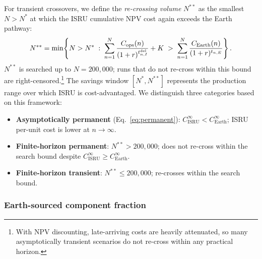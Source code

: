 \documentclass[5p,twocolumn]{elsarticle}
\begin{document}
For transient crossovers, we define the \emph{re-crossing volume} $N^{**}$ as the smallest $N > N^*$ at which the ISRU cumulative NPV cost again exceeds the Earth pathway:
\begin{equation}\footnotesize
  N^{**} = \min\!\left\{N > N^* \;:\; \sum_{n=1}^{N} \frac{C_{\mathrm{ops}}(n)}{(1+r)^{t_{n,I}^{\mathrm{del}}}} + K \;>\; \sum_{n=1}^{N} \frac{C_{\mathrm{Earth}}(n)}{(1+r)^{t_{n,E}}}\right\}.
  \label{eq:recrossing}
\end{equation}
$N^{**}$ is searched up to $N = 200{,}000$; runs that do not re-cross within this bound are right-censored.\footnote{With NPV discounting, late-arriving costs are heavily attenuated, so many asymptotically transient scenarios do not re-cross within any practical horizon.} The savings window $[N^*, N^{**}]$ represents the production range over which ISRU is cost-advantaged. We distinguish three categories based on this framework:
\begin{itemize}
\item \textbf{Asymptotically permanent} (Eq.~\ref{eq:permanent}): $C_{\mathrm{ISRU}}^{\infty} < C_{\mathrm{Earth}}^{\infty}$; ISRU per-unit cost is lower at $n \to \infty$.
\item \textbf{Finite-horizon permanent}: $N^{**} > 200{,}000$; does not re-cross within the search bound despite $C_{\mathrm{ISRU}}^{\infty} \geq C_{\mathrm{Earth}}^{\infty}$.
\item \textbf{Finite-horizon transient}: $N^{**} \leq 200{,}000$; re-crosses within the search bound.
\end{itemize}

\subsubsection{Earth-sourced component fraction}
\label{sec:vitamin}
\end{document}
